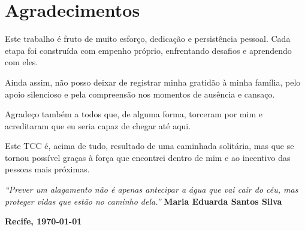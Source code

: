 \chapter*{Agradecimentos}

Este trabalho é fruto de muito esforço, dedicação e persistência pessoal. Cada etapa foi construída com empenho próprio, enfrentando desafios e aprendendo com eles.  

Ainda assim, não posso deixar de registrar minha gratidão à minha família, pelo apoio silencioso e pela compreensão nos momentos de ausência e cansaço.  

Agradeço também a todos que, de alguma forma, torceram por mim e acreditaram que eu seria capaz de chegar até aqui.  

Este TCC é, acima de tudo, resultado de uma caminhada solitária, mas que se tornou possível graças à força que encontrei dentro de mim e ao incentivo das pessoas mais próximas.

\bigskip

\begin{flushright}
\textit{``Prever um alagamento não é apenas antecipar a água que vai cair do céu, mas proteger vidas que estão no caminho dela.''}
\hfill \textbf{Maria Eduarda Santos Silva}
\end{flushright}

\vspace{2cm}

\begin{center}
\textbf{Recife, \today}
\end{center}
